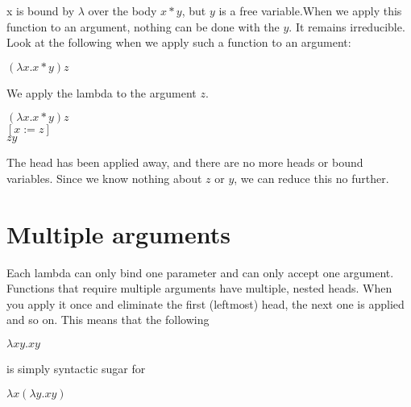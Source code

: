 \documentclass[11pt]{article}
\begin{document}
x is bound by $\lambda$ over the body $x*y$, but $y$ is a free variable.When we apply this function to an argument, nothing can be done with the $y$. It remains irreducible.
\\
Look at the following when we apply such a function to an argument:  
\begin{center}
$(\lambda x.x*y)z$
\end{center}
We apply the lambda to the argument $z$. \\
\begin{center}
$(\lambda x.x*y)z$ \\
\hspace{.25in}$[x:=z]$ \\
\hspace{.55in}$zy$  \\
\end{center}

The head has been applied away, and there are no more heads or bound variables. Since we know nothing about $z$ or $y$, we can reduce this no further.
\section{Multiple arguments}
Each lambda can only bind one parameter and can only accept one argument. Functions that require multiple arguments have multiple, nested heads. When you apply it once and eliminate the first (leftmost) head, the next one is applied and so on. This means that the following
\begin{center}
$\lambda xy.xy$
\end{center}
is simply syntactic sugar for 
\begin{center}
$\lambda x(\lambda y.xy)$
\end{center}
\end{document}
